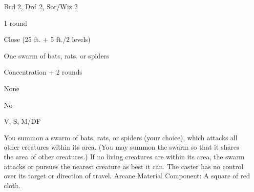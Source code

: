 
\begin{description*}
\item[Level:] Brd 2, Drd 2, Sor/Wiz 2
\item[Casting Time:] 1 round
\item[Range:] Close (25 ft. + 5 ft./2 levels)
\item[Effect:] One swarm of bats, rats, or spiders
\item[Duration:] Concentration + 2 rounds
\item[Saving Throw:] None
\item[Spell Resistance:] No
\item[Components:] V, S, M/DF
\end{description*}

You summon a swarm of bats, rats, or spiders (your choice), which attacks all other
creatures within its area. (You may summon the swarm so that it shares the area
of other creatures.) If no living creatures are within its area, the swarm attacks
or pursues the nearest creature as best it can. The caster has no control over
its target or direction of travel.
Arcane Material Component: A square of red cloth.